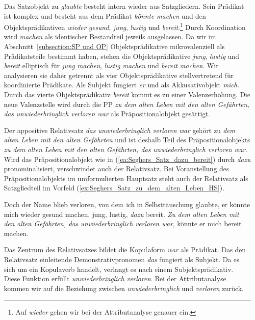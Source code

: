 Das Satzobjekt zu \textit{glaubte} besteht intern wieder aus Satzgliedern. Sein Prädikat ist komplex und besteht aus dem Prädikat \textit{könnte machen} und den Objektsprädikativen \textit{wieder gesund}, \textit{jung}, \textit{lustig} und \textit{bereit}.\footnote{Auf \textit{wieder} gehen wir bei der Attributanalyse genauer ein.} Durch Koordination wird \textit{machen} als identischer Bestandteil jeweils ausgelassen. Da wir im Abschnitt~\ref{subsection:SP und OP} Objektsprädikative mikrovalenziell als Prädikatsteile bestimmt haben, stehen die Objektsprädikative \textit{jung}, \textit{lustig} und \textit{bereit} elliptisch für \textit{jung machen}, \textit{lustig machen} und \textit{bereit machen}. Wir analysieren sie daher getrennt als vier Objektsprädikative stellvertretend für koordinierte Prädikate. Als Subjekt fungiert \textit{er} und als Akkusativobjekt \textit{mich}. Durch das vierte Objektsprädikativ \textit{bereit} kommt es zu einer Valenzerhöhung. Die neue Valenzstelle wird durch die PP \textit{zu dem alten Leben mit den alten Gefährten, das unwiederbringlich verloren war} als Präpositionalobjekt gesättigt.   

Der appositive Relativsatz \textit{das unwiederbringlich verloren war} gehört zu \textit{dem alten Leben mit den alten Gefährten} und ist deshalb Teil des Präpositionalobjekts \textit{zu dem alten Leben mit den alten Gefährten, das unwiederbringlich verloren war}. Wird das Präpositionalobjekt wie in (\ref{ea:Seghers_Satz_dazu_bereit}) durch \textit{dazu} pronominalisiert, verschwindet auch der Relativsatz. Bei Voranstellung des Präpositionalobjekts im umformulierten Hauptsatz steht auch der Relativsatz als Satzgliedteil im Vorfeld (\ref{ex:Seghers_Satz_zu_dem_alten_Leben_HS}).

\ea \label{ea:Seghers_Satz_bereit_zu}
\ea \label{ea:Seghers_Satz_dazu_bereit} Doch der Name blieb verloren, von dem ich in Selbsttäuschung glaubte, er könnte mich wieder gesund machen, jung, lustig, \textit{dazu} bereit.
\ex \label{ex:Seghers_Satz_zu_dem_alten_Leben_HS} \textit{Zu dem alten Leben mit den alten Gefährten, das unwiederbringlich verloren war,} könnte er mich bereit machen.
\z 
\z 

Das Zentrum des Relativsatzes bildet die Kopulaform \textit{war} als Prädikat. Das den Relativsatz einleitende Demonstrativpronomen \textit{das} fungiert als Subjekt. Da es sich um ein Kopulaverb handelt, verlangt es nach einem Subjektsprädikativ. Diese Funktion erfüllt \textit{unwiederbringlich verloren}. Bei der Attributanalyse kommen wir auf die Beziehung zwischen \textit{unwiederbringlich} und \textit{verloren} zurück.   

